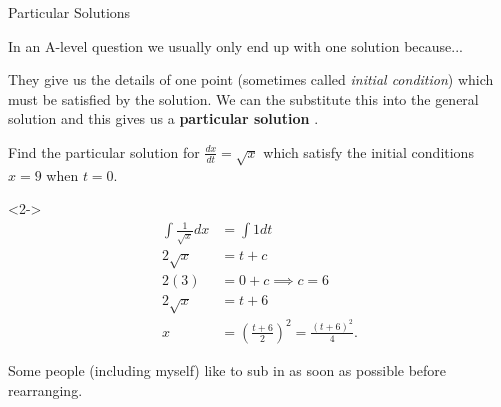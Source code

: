 \documentclass[8pt]{beamer}
\begin{document}
\begin{frame}[shrink=2]{Particular Solutions}
	\begin{definition}
		In an A-level question we usually only end up with one solution because...

		They give us the details of one point (sometimes called \emph{initial condition}) which must be satisfied by the solution. We can the substitute this into the general solution and this gives us a \textbf{particular solution} .
		

	\end{definition}

	\begin{problem}
		Find the particular solution for $\frac{dx}{dt}=\sqrt{x} $ which satisfy the initial conditions $x=9$ when $t=0.$

	\end{problem}

	\begin{solution}<2->
		\begin{align*}
			\int \frac{1}{\sqrt{x} } dx &= \int 1 dt \\
			2\sqrt{x} &= t+c \\
			2(3) &= 0+c \implies c=6 \\
			2\sqrt{x} &= t+6 \\
			x&= \left( \frac{t+6}{2} \right)^2 = \frac{(t+6)^2}{4}  
		.\end{align*}
	\end{solution}

	\alert<2>{Some people (including myself) like to sub in as soon as possible before rearranging.}
\end{frame}
\end{document}
